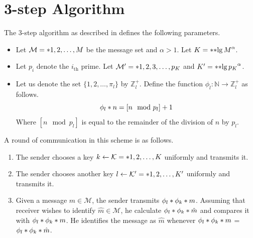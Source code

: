 \section{3-step Algorithm}
The 3-step algorithm as described in \cite{multiway} defines the following parameters.
\begin{itemize}
	\item Let \(\mathcal{M} = \set{1,2, \dots, M }\) be the message set and \(\alpha > 1\). Let \(K = \ceil{\bracket{\lg M}^{\alpha}}\).
	\item Let \(p_i\) denote the \(i_{\mathrm{th}}\) prime. Let \(\mathcal{M}' = \set{1, 2, 3 ,\dots, p_K}\) and \(K' = \ceil{\bracket{\lg p_K}^{\alpha}}\). 
	\item Let us denote the set \(\{1,2, \dots, \pi_l \}\) by \(\mathbb{Z}^+_l\).  Define the function \(\phi_l: \mathbb{N} \to \mathbb{Z}_{l}^+ \) as follows.
	\begin{equation}
		\func{\phi_l}{n} = [n \mod p_l] + 1
	\end{equation}
	Where \([n \mod p_l]\) is equal to the remainder of the division of \(n\) by \(p_l\).
\end{itemize}
A round of communication in this scheme is as follows.
\begin{enumerate}
	\item The sender chooses a key \(k \gets \mathcal{K} = \set{1,2,\dots, K }\) uniformly and transmits it.
	\item The sender chooses another key \(l \gets \mathcal{K}' = \set{1,2,\dots, K' }\) uniformly and transmits it.
	\item Given a message \(m \in \mathcal{M}\), the sender transmits \(\func{\phi_l}{\func{\phi_k}{m}}\). Assuming that receiver wishes to identify \(\hat{m} \in \mathcal{M}\), he calculate \(\func{\phi_l}{\func{\phi_k}{\hat{m}}}\) and compares it with \(\func{\phi_l}{\func{\phi_k}{m}}\). He identifies the message as \(\hat{m}\) whenever \(\func{\phi_l}{\func{\phi_k}{m}}\) = \(\func{\phi_l}{\func{\phi_k}{\hat{m}}}\).
\end{enumerate}

